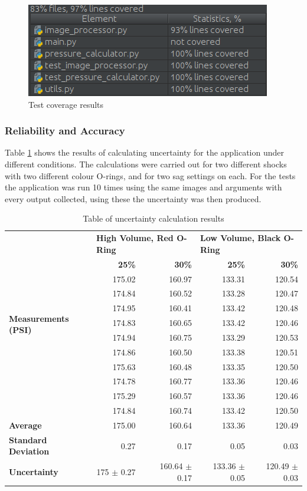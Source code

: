 			\begin{figure}[h!]
				\centering
				\includegraphics[scale=0.7]{../images/results/coverage.png}
				\caption{Test coverage results}
				\label{fig:coverage}
			\end{figure}
		\subsubsection{Reliability and Accuracy}
			Table \ref{tab:uncertainty} shows the results of calculating uncertainty for the application under different conditions. The calculations were carried out for two different shocks with two different colour O-rings, and for two sag settings on each. For the tests the application was run 10 times using the same images and arguments with every output collected, using these the uncertainty was then produced.
			\begin{table}[h!]
				
				\centering
				\caption{Table of uncertainty calculation results}
				\label{tab:uncertainty}
				\begin{tabular}{|l|r|r|r|r|}
					\hline
					\multirow{12}{7em}{\bfseries Measurements (PSI)}&\multicolumn{2}{|l|}{\bfseries High Volume, Red O-Ring}&\multicolumn{2}{|l|}{\bfseries Low Volume, Black O-Ring}\\
					\cline{2-5}&\bfseries 25\%&\bfseries 30\%&\bfseries 25\%&\bfseries 30\%\\
					\hline
					&175.02&160.97&133.31&120.54\\
					&174.84&160.52&133.28&120.47\\
					&174.95&160.41&133.42&120.48\\
					&174.83&160.65&133.42&120.46\\
					&174.94&160.75&133.29&120.53\\
					&174.86&160.50&133.38&120.51\\
					&175.63&160.48&133.35&120.50\\
					&174.78&160.77&133.36&120.46\\
					&175.29&160.57&133.36&120.46\\
					&174.84&160.74&133.42&120.50\\
					\hline
					\bfseries Average&175.00&160.64&133.36&120.49\\
					\bfseries Standard Deviation&0.27&0.17&0.05&0.03\\
					\bfseries Uncertainty&175 $\pm$ 0.27&160.64 $\pm$ 0.17&133.36 $\pm$ 0.05&120.49 $\pm$ 0.03\\
					\hline
				\end{tabular}
			\end{table}

